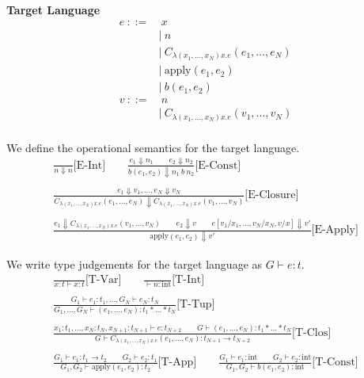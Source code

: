 \documentclass[9pt]{article}
\renewcommand*{\int}{\text{int}}
\newcommand*{\apply}{\text{apply}}
\begin{document}
\textbf{Target Language}
\begin{align*}
    e\ ::=&\ x\\
    &|\ n\\
    &|\ C_{\lambda (x_1, \dots, x_N) x.e} (e_1, \dots, e_N)\\
    &|\ \apply (e_1, e_2)\\
    &|\ b (e_1, e_2)\\
    v\ ::=&\ n\\
    &|\ C_{\lambda (x_1, \dots, x_N) x.e} (v_1, \dots, v_N)\\
\end{align*}

We define the operational semantics for the target language.
\begin{gather*}
    \frac{}{n \Downarrow n} \text{[E-Int]} \qquad
    \frac{e_1 \Downarrow n_1 \qquad e_2 \Downarrow n_2}{b(e_1, e_2) \Downarrow n_1\ b\ n_2} \text{[E-Const]}\\ \\
    \frac{e_1 \Downarrow v_1, \dots, e_N \Downarrow v_N}{C_{\lambda (x_1, \dots, x_N) x.e} (e_1, \dots, e_N) \Downarrow C_{\lambda (x_1, \dots, x_N) x.e} (v_1, \dots, v_N)} \text{[E-Closure]}\\ \\
    \frac{e_1 \Downarrow C_{\lambda (x_1, \dots, x_N) x.e} (v_1, \dots, v_N) \qquad e_2 \Downarrow v \qquad e[v_1/x_1, \dots, v_N/x_N, v/x] \Downarrow v'}{\apply (e_1, e_2) \Downarrow v'}\text{[E-Apply]}
\end{gather*}

We write type judgements for the target language as $G \vdash e : t$.
\begin{gather*}
    \frac{}{x: t \vdash x: t} \text{[T-Var]} \qquad
    \frac{}{\vdash n : \int} \text{[T-Int]}\\ \\
    \frac{G_1 \vdash e_1 : t_1, \dots, G_N \vdash e_N: t_N}{G_1, \dots, G_N \vdash (e_1, \dots, e_N): t_1 * \dots * t_N}\text{[T-Tup]} \\ \\
    \frac{x_1 : t_1, \dots, x_N : t_N, x_{N+1} : t_{N+1} \vdash e : t_{N+2} \qquad
          G \vdash (e_1, \dots, e_N) : t_1 * \dots * t_N}
         {G \vdash C_{\lambda (x_1, \dots, x_N) x.e} (e_1, \dots, e_N): t_{N+1} \rightarrow t_{N+2}} \text{[T-Clos]}\\
    \\
%
    \frac{G_1 \vdash e_1 : t_1 \rightarrow t_2 \qquad G_2 \vdash e_2: t_1}{G_1, G_2 \vdash \apply(e_1, e_2) : t_2} \text{[T-App]}\qquad
    \frac{G_1 \vdash e_1 : \int \qquad G_2 \vdash e_2 : \int}{G_1, G_2 \vdash b(e_1, e_2) : \int} \text{[T-Const]}
\end{gather*}
\end{document}
